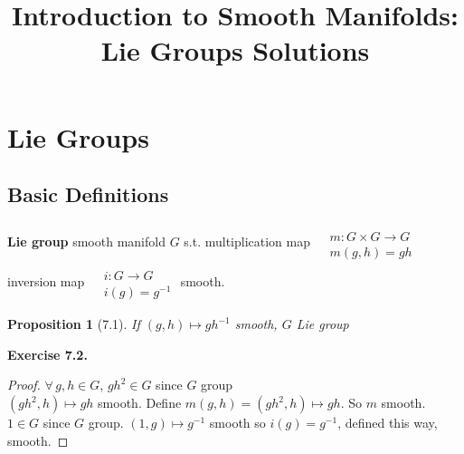 \documentclass[11pt]{amsart}
\title{Introduction to Smooth Manifolds: Lie Groups Solutions}
\newtheorem{proposition}{Proposition}
\theoremstyle{definition}
\newcommand{\exercisehead}[1]{\medskip\noindent\textbf{Exercise #1.} }
\begin{document}
\maketitle
\section{Lie Groups}

%
%
%

\subsection*{Basic Definitions}

\textbf{Lie group} smooth manifold $G$ s.t. multiplication map $\begin{aligned} & \quad \\
  & m : G \times G \to G \\
  & m(g,h) = gh \end{aligned}$ \\
inversion map $\begin{aligned} & \quad \\
  & i : G \to G \\
  & i(g) = g^{-1} \end{aligned}$
smooth.

\begin{proposition}[7.1]
If $(g,h) \mapsto gh^{-1}$ smooth, $G$ Lie group
\end{proposition}
\exercisehead{7.2}
\begin{proof}
  $\forall \, g,h \in G$, $gh^2 \in G$ since $G$ group \\
$(gh^2,h) \mapsto gh$ smooth.  Define $m(g,h) = (gh^2,h) \mapsto gh$.  So $m$ smooth.  \\
$1\in G$ since $G$ group.  $(1,g) \mapsto g^{-1}$ smooth so $i(g) = g^{-1}$, defined this way, smooth.
\end{proof}
\end{document}
